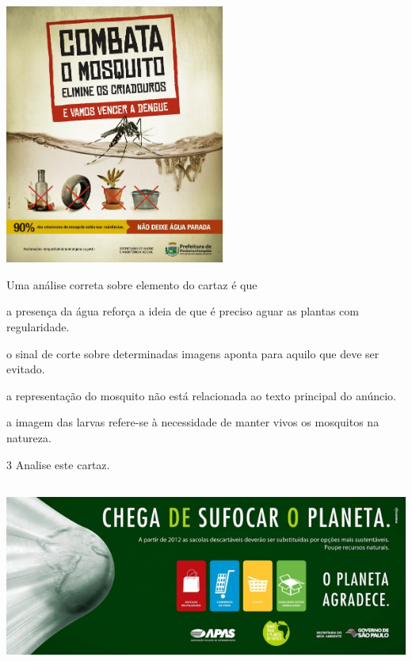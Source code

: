 \includegraphics[width=2.84375in,height=3.36642in]{./media/image13.jpeg}

Uma análise correta sobre elemento do cartaz é que

\begin{escolha}
\item a presença da água reforça a ideia de que é preciso aguar as plantas com regularidade.

\item o sinal de corte sobre determinadas imagens aponta para aquilo que deve ser evitado.

\item a representação do mosquito não está relacionada ao texto principal do anúncio.

\item a imagem das larvas refere-se à necessidade de manter vivos os mosquitos na natureza.
\end{escolha}


\num{3} Analise este cartaz.


\includegraphics[width=6.14514in,height=2.43088in]{./media/image14.jpeg}

